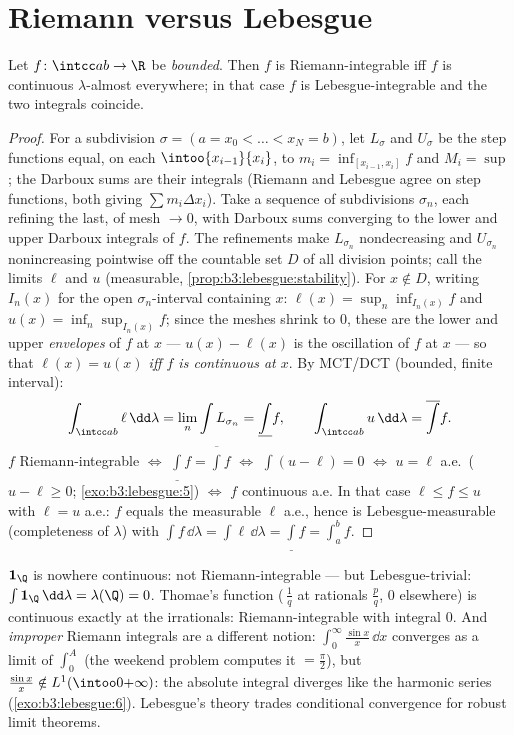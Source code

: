 \section{Riemann versus Lebesgue}

\begin{theorem}
\label{thm:b3:lebesgue:riemann}
Let $f \colon \intcc ab \to \R$ be \emph{bounded}. Then $f$ is
Riemann-integrable iff $f$ is continuous $\lambda$-almost
everywhere; in that case $f$ is Lebesgue-integrable and the two
integrals coincide.
\end{theorem}

\begin{proof}
For a subdivision $\sigma = (a = x_0 < \dots < x_N = b)$, let
$L_\sigma$ and $U_\sigma$ be the step functions equal, on each
$\intoo{x_{i-1}}{x_i}$, to $m_i = \inf_{[x_{i-1}, x_i]}f$ and
$M_i = \sup$; the Darboux sums are their integrals (Riemann and
Lebesgue agree on step functions, both giving $\sum
m_i\Delta x_i$). Take a sequence of subdivisions $\sigma_n$,
each refining the last, of mesh $\to 0$, with Darboux sums
converging to the lower and upper Darboux integrals of $f$.
The refinements make $L_{\sigma_n}$ nondecreasing and
$U_{\sigma_n}$ nonincreasing pointwise off the countable set
$D$ of all division points; call the limits $\ell$ and $u$
(measurable, \cref{prop:b3:lebesgue:stability}). For $x \notin
D$, writing $I_n(x)$ for the open $\sigma_n$-interval
containing $x$: $\ell(x) = \sup_n\inf_{I_n(x)}f$ and $u(x) =
\inf_n\sup_{I_n(x)}f$; since the meshes shrink to $0$, these
are the lower and upper \emph{envelopes} of $f$ at $x$
--- $u(x) - \ell(x)$ is the oscillation of $f$ at $x$ --- so
that \emph{$\ell(x) = u(x)$ iff $f$ is continuous at $x$}. By MCT/DCT (bounded, finite interval):
\[
\int_{\intcc ab}\ell\,\dd\lambda = \lim_n\int L_{\sigma_n}
= \underline{\int}f,
\qquad
\int_{\intcc ab}u\,\dd\lambda = \overline{\int}f .
\]
$f$ Riemann-integrable $\iff$ $\underline\int f =
\overline\int f$ $\iff$ $\int(u - \ell) = 0$ $\iff$ $u = \ell$
a.e.\ ($u - \ell \geq 0$; \cref{exo:b3:lebesgue:5}) $\iff$ $f$
continuous a.e. In that case $\ell \leq f \leq u$ with $\ell =
u$ a.e.: $f$ equals the measurable $\ell$ a.e., hence is
Lebesgue-measurable (completeness of $\lambda$) with
$\int f\,\dd\lambda = \int\ell\,\dd\lambda = \underline\int f =
\int_a^bf$.
\end{proof}

\begin{example}\label{ex:b3:lebesgue:riemannexamples}
$\mathbf 1_\Q$ is nowhere continuous: not Riemann-integrable
--- but Lebesgue-trivial: $\int\mathbf 1_\Q\,\dd\lambda =
\lambda(\Q) = 0$. Thomae's function (\,$\frac1q$ at rationals
$\frac pq$, $0$ elsewhere) is continuous exactly at the
irrationals: Riemann-integrable with integral $0$. And
\emph{improper} Riemann integrals are a different notion:
$\int_0^\infty\frac{\sin x}x\,\dd x$ converges as a limit of
$\int_0^A$ (the weekend problem computes it $= \frac\pi2$),
but $\frac{\sin x}x \notin L^1(\intoo0{+\infty})$: the absolute
integral diverges like the harmonic series
(\cref{exo:b3:lebesgue:6}). Lebesgue's theory trades
conditional convergence for robust limit theorems.
\end{example}

